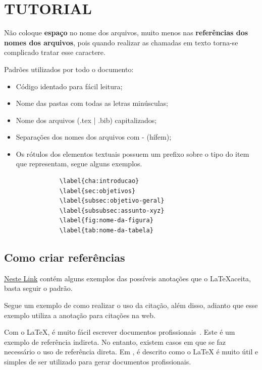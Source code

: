\section{\textbf{TUTORIAL}}
    \label{cha:tutorial}
\hypersetup{colorlinks=true, linkcolor=black, urlcolor=black}
    Não coloque \textbf{espaço} no nome dos arquivos, muito menos nas \textbf{referências dos nomes dos arquivos}, pois quando realizar as chamadas em texto torna\hyp{se} complicado tratar esse caractere.
    
    Padrões utilizados por todo o documento:
    \begin{itemize}
        \item Código identado para fácil leitura;
        \item Nome das pastas com todas as letras minúsculas;
        \item Nome dos arquivos (.tex | .bib) capitalizados;
        \item Separações dos nomes dos arquivos com - (hífem);
        \item Os rótulos dos elementos textuais possuem um prefixo sobre o tipo do item que representam, segue alguns exemplos.
        \begin{verbatim} 
            \label{cha:introducao}
            \label{sec:objetivos}
            \label{subsec:objetivo-geral}
            \label{subsubsec:assunto-xyz}
            \label{fig:nome-da-figura}
            \label{tab:nome-da-tabela}
        \end{verbatim} 
    \end{itemize}

\subsection{\textbf{Como criar referências}}
\label{sec:referencias}

\href{https://verbosus.com/bibtex-style-examples.html}{Neste Link} contém alguns exemplos das possíveis anotações que o \LaTeX aceita, basta seguir o padrão.

Segue um exemplo de como realizar o uso da citação, além disso, adianto que esse exemplo utiliza a anotação para citações na web.

Com o \LaTeX, é muito fácil escrever documentos profissionais~\cite{latex1995}. Este é um exemplo de
referência indireta. No entanto, existem casos em que se faz necessário o uso de referência direta.
Em , é descrito como o LaTeX é muito útil e simples de ser utilizado para gerar
documentos profissionais.

